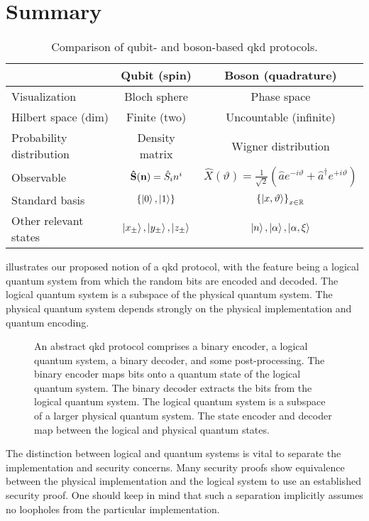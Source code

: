 \section*{Summary}

\begin{table}[htb]
	\centering	
	\begin{tabular}{lcc}
		\toprule
			& Qubit (spin) & Boson (quadrature) \\
		\midrule
			Visualization & Bloch sphere & Phase space \\
			Hilbert space (dim) & Finite (two) & Uncountable (infinite) \\
			Probability distribution & Density matrix & Wigner distribution \\
			Observable & $\vb{\hat{S}}(\vb{n})=\hat{S}_in^i$ & $\hat{X}(\vartheta)=\frac{1}{\sqrt{2}}\left(\hat{a}e^{-i\vartheta}+\hat{a}^\dagger e^{+i\vartheta}\right)$ \\
			Standard basis & $\left\{\ket{0},\ket{1}\right\}$ & $\left\{\ket{x,\vartheta}\right\}_{x\in\mathbb{R}}$ \\
			Other relevant states & $\ket{x_\pm},\ket{y_\pm},\ket{z_\pm}$ & $\ket{n},\ket{\alpha},\ket{\alpha,\xi}$ \\
		\bottomrule
	\end{tabular}
	\caption{Comparison of qubit- and boson-based \gls{qkd} protocols.}
\end{table}

 illustrates our proposed notion of a \gls{qkd} protocol, with the feature being a logical quantum system from which the random bits are encoded and decoded.
The logical quantum system is a subspace of the physical quantum system.
The physical quantum system depends strongly on the physical implementation and quantum encoding.
\begin{figure}[htb]
	\centering
	
	\caption{An abstract \gls{qkd} protocol comprises a binary encoder, a logical quantum system, a binary decoder, and some post-processing. The binary encoder maps bits onto a quantum state of the logical quantum system. The binary decoder extracts the bits from the logical quantum system. The logical quantum system is a subspace of a larger physical quantum system. The state encoder and decoder map between the logical and physical quantum states.}\label{fig:qkd_protocol}
\end{figure}
The distinction between logical and quantum systems is vital to separate the implementation and security concerns.
Many security proofs show equivalence between the physical implementation and the logical system to use an established security proof.
One should keep in mind that such a separation implicitly assumes no loopholes from the particular implementation.